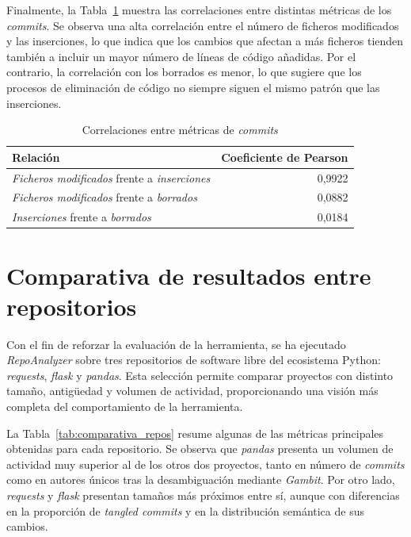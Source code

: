 \documentclass[a4paper, 12pt]{book}
\begin{document}
Finalmente, la Tabla~\ref{tab:correlaciones} muestra las correlaciones entre distintas métricas de los \emph{commits}. Se observa una alta correlación entre el número de ficheros modificados y las inserciones, lo que indica que los cambios que afectan a más ficheros tienden también a incluir un mayor número de líneas de código añadidas. Por el contrario, la correlación con los borrados es menor, lo que sugiere que los procesos de eliminación de código no siempre siguen el mismo patrón que las inserciones.

\begin{table}[H]
\centering
\small
\begin{tabular}{|p{7cm}|r|}
\hline
\textbf{Relación} & \textbf{Coeficiente de Pearson} \\
\hline

\emph{Ficheros modificados} frente a \emph{inserciones} & 0,9922 \\
\hline

\emph{Ficheros modificados} frente a \emph{borrados} & 0,0882 \\
\hline

\emph{Inserciones} frente a \emph{borrados} & 0,0184 \\
\hline

\end{tabular}
\caption{Correlaciones entre métricas de \emph{commits}}
\label{tab:correlaciones}
\end{table}

\section{Comparativa de resultados entre repositorios}
\label{sec:comparativa_resultados}

Con el fin de reforzar la evaluación de la herramienta, se ha ejecutado \emph{RepoAnalyzer} sobre tres repositorios de software libre del ecosistema Python: \emph{requests}, \emph{flask} y \emph{pandas}. Esta selección permite comparar proyectos con distinto tamaño, antigüedad y volumen de actividad, proporcionando una visión más completa del comportamiento de la herramienta.

La Tabla~\ref{tab:comparativa_repos} resume algunas de las métricas principales obtenidas para cada repositorio. Se observa que \emph{pandas} presenta un volumen de actividad muy superior al de los otros dos proyectos, tanto en número de \emph{commits} como en autores únicos tras la desambiguación mediante \emph{Gambit}. Por otro lado, \emph{requests} y \emph{flask} presentan tamaños más próximos entre sí, aunque con diferencias en la proporción de \emph{tangled commits} y en la distribución semántica de sus cambios.
\end{document}
